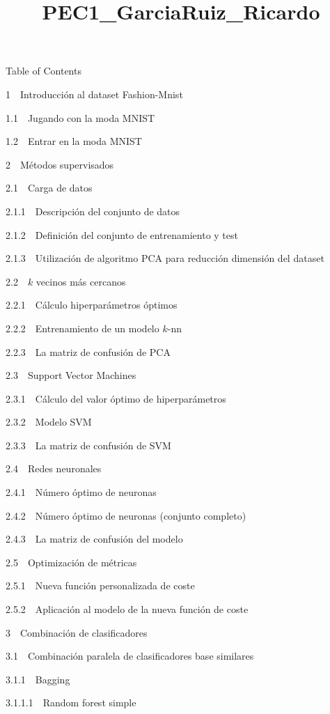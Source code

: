 \documentclass[11pt]{article}
\title{PEC1\_GarciaRuiz\_Ricardo}
\begin{document}
    
    
    \maketitle
    
    

    
    Table of Contents{}

{{1~~}Introducción al dataset Fashion-Mnist}

{{1.1~~}Jugando con la moda MNIST}

{{1.2~~}Entrar en la moda MNIST}

{{2~~}Métodos supervisados}

{{2.1~~}Carga de datos}

{{2.1.1~~}Descripción del conjunto de datos}

{{2.1.2~~}Definición del conjunto de entrenamiento y test}

{{2.1.3~~}Utilización de algoritmo PCA para reducción dimensión del
dataset}

{{2.2~~}\(k\) vecinos más cercanos}

{{2.2.1~~}Cálculo hiperparámetros óptimos}

{{2.2.2~~}Entrenamiento de un modelo \(k\)-nn}

{{2.2.3~~}La matriz de confusión de PCA}

{{2.3~~}Support Vector Machines}

{{2.3.1~~}Cálculo del valor óptimo de hiperparámetros}

{{2.3.2~~}Modelo SVM}

{{2.3.3~~}La matriz de confusión de SVM}

{{2.4~~}Redes neuronales}

{{2.4.1~~}Número óptimo de neuronas}

{{2.4.2~~}Número óptimo de neuronas (conjunto completo)}

{{2.4.3~~}La matriz de confusión del modelo}

{{2.5~~}Optimización de métricas}

{{2.5.1~~}Nueva función personalizada de coste}

{{2.5.2~~}Aplicación al modelo de la nueva función de coste}

{{3~~}Combinación de clasificadores}

{{3.1~~}Combinación paralela de clasificadores base similares}

{{3.1.1~~}Bagging}

{{3.1.1.1~~}Random forest simple}
\end{document}
